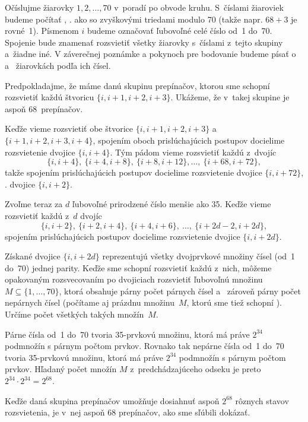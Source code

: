 {%
Očíslujme žiarovky $1, 2,\ldots,70$ v~poradí po obvode kruhu.
S~číslami žiaroviek budeme počítať , \tj. ako so zvyškovými
triedami modulo 70 (takže napr. ${68+3}$ je rovné~1). Písmenom $i$
budeme označovať ľubovoľné celé číslo od~1 do~70. Spojenie
 bude znamenať rozsvietiť
všetky žiarovky s~číslami z~tejto skupiny a~žiadne iné. V záverečnej
poznámke a pokynoch pre bodovanie budeme písať o  a~ žiarovkách podľa ich čísel.

Predpokladajme, že máme danú skupinu
prepínačov, ktorou sme schopní rozsvietiť každú štvoricu
$\{i, i+1, i+2, i+3\}$. Ukážeme, že v~takej skupine je
aspoň 68~prepínačov.

Keďže vieme rozsvietiť obe štvorice $\{i, i+1, i+2, i+3\}$ a
$\{i+1, i+2, i+3, i+4\}$, spojením oboch prislúchajúcich postupov
docielime rozsvietenie dvojice $\{i,i+4\}$. Tým pádom vieme
rozsvietiť každú z~dvojíc
$$
\{i, i+4\},\ \{i+4, i+8\},\ \{i+8, i+12\}, \ldots,\ \{i+68,i+72\},
$$
takže spojením prislúchajúcich postupov docielime rozsvietenie
dvojice $\{i, i+72\}$, \tj. dvojice $\{i,i+2\}$.

Zvoľme teraz za $d$ ľubovoľné prirodzené číslo menšie ako 35.
Keďže vieme rozsvietiť každú z~$d$ dvojíc
$$
\{i,i+2\},\ \{i+2, i+4\},\ \{i+4,i+6\},\ \ldots,\ \{i+2d-2, i+2d\},
$$
spojením prislúchajúcich postupov docielime rozsvietenie dvojice $\{i,i+2d\}$.

Získané dvojice $\{i,i+2d\}$ reprezentujú všetky dvojprvkové
množiny čísel (od~1 do~70) jednej parity.
Keďže sme schopní rozsvietiť každú z~nich, môžeme opakovaným
rozsvecovaním po dvojiciach rozsvietiť ľubovoľnú množinu
$M \subseteq \{1, \ldots, 70\}$, ktorá obsahuje párny počet
párnych čísel a~ zároveň párny počet nepárnych čísel (počítame aj prázdnu
množinu~$M$, ktorú sme tiež schopní ).
Určíme počet všetkých takých množín~$M$.

Párne čísla od~1 do~70 tvoria 35-prvkovú množinu, ktorá má
práve $2^{34}$ podmnožín s párnym počtom prvkov. Rovnako tak
nepárne čísla od~1 do~70 tvoria 35-prvkovú množinu, ktorá má
práve $2^{34}$ podmnožín s párnym počtom prvkov. Hľadaný počet
množín $M$ z~predchádzajúceho odseku je preto
$2^{34} \cdot 2^{34} = 2^{68}$.

Keďže daná skupina prepínačov umožňuje dosiahnuť aspoň $2^{68}$
rôznych stavov rozsvietenia, je v~nej aspoň 68
prepínačov,
ako sme sľúbili dokázať.

}
